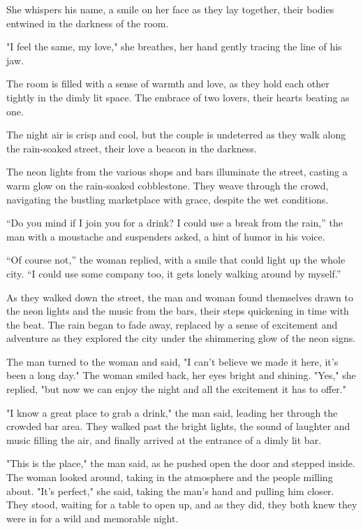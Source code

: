 \documentclass[smalldemyvopaper,11pt,twoside,onecolumn,openright,extrafontsizes]{memoir}
\begin{document}
She whispers his name, a smile on her face as they lay together, their bodies entwined in the darkness of the room.\par
"I feel the same, my love," she breathes, her hand gently tracing the line of his jaw.\par
The room is filled with a sense of warmth and love, as they hold each other tightly in the dimly lit space. The embrace of two lovers, their hearts beating as one.\par
The night air is crisp and cool, but the couple is undeterred as they walk along the rain-soaked street, their love a beacon in the darkness.\par
The neon lights from the various shops and bars illuminate the street, casting a warm glow on the rain-soaked cobblestone. They weave through the crowd, navigating the bustling marketplace with grace, despite the wet conditions.\par
“Do you mind if I join you for a drink? I could use a break from the rain,” the man with a moustache and suspenders asked, a hint of humor in his voice.\par
“Of course not,” the woman replied, with a smile that could light up the whole city. “I could use some company too, it gets lonely walking around by myself.”\par
As they walked down the street, the man and woman found themselves drawn to the neon lights and the music from the bars, their steps quickening in time with the beat. The rain began to fade away, replaced by a sense of excitement and adventure as they explored the city under the shimmering glow of the neon signs.\par
The man turned to the woman and said, "I can't believe we made it here, it's been a long day." The woman smiled back, her eyes bright and shining. "Yes," she replied, "but now we can enjoy the night and all the excitement it has to offer."\par
"I know a great place to grab a drink," the man said, leading her through the crowded bar area. They walked past the bright lights, the sound of laughter and music filling the air, and finally arrived at the entrance of a dimly lit bar.\par
"This is the place," the man said, as he pushed open the door and stepped inside. The woman looked around, taking in the atmosphere and the people milling about. "It's perfect," she said, taking the man's hand and pulling him closer. They stood, waiting for a table to open up, and as they did, they both knew they were in for a wild and memorable night.\par
\end{document}
